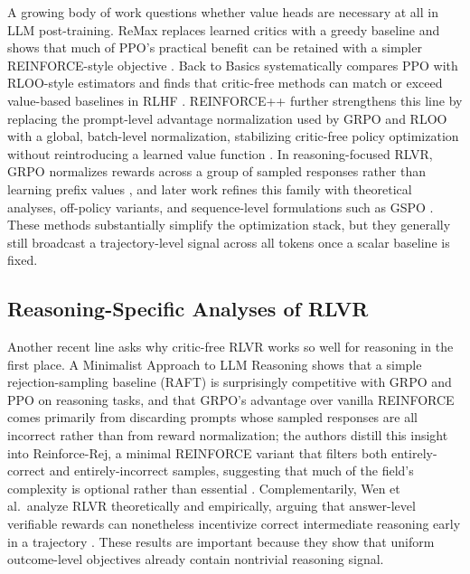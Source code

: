A growing body of work questions whether value heads are necessary at all in LLM
post-training. ReMax replaces learned critics with a greedy baseline and shows that much
of PPO's practical benefit can be retained with a simpler REINFORCE-style objective
\cite{li2023remax}. Back to Basics systematically compares PPO with RLOO-style
estimators and finds that critic-free methods can match or exceed value-based baselines
in RLHF \cite{ahmadian2024backtobasics}. REINFORCE++ further strengthens this line by
replacing the prompt-level advantage normalization used by GRPO and RLOO with a
global, batch-level normalization, stabilizing critic-free policy optimization
without reintroducing a learned value function \cite{hu2025reinforcepp}. In reasoning-focused RLVR, GRPO
normalizes rewards across a group of sampled responses rather than learning prefix
values \cite{shao2024deepseekmath}, and later work refines this family with theoretical
analyses, off-policy variants, and sequence-level formulations such as GSPO
\cite{mroueh2025revisiting,zheng2025gspo}. These methods substantially simplify the
optimization stack, but they generally still broadcast a trajectory-level signal across
all tokens once a scalar baseline is fixed.

\subsection{Reasoning-Specific Analyses of RLVR}

Another recent line asks why critic-free RLVR works so well for reasoning in the first
place. A Minimalist Approach to LLM Reasoning shows that a simple rejection-sampling
baseline (RAFT) is surprisingly competitive with GRPO and PPO on reasoning
tasks, and that GRPO's advantage over vanilla REINFORCE comes primarily from
discarding prompts whose sampled responses are all incorrect rather than from
reward normalization; the authors distill this insight into Reinforce-Rej, a
minimal REINFORCE variant that filters both entirely-correct and
entirely-incorrect samples, suggesting that much of the field's complexity is
optional rather than essential \cite{xiong2025minimalist}. Complementarily, Wen et al.\
analyze RLVR theoretically and empirically, arguing that answer-level verifiable rewards
can nonetheless incentivize correct intermediate reasoning early in a trajectory
\cite{wen2025rlvrimplicit}. These results are important because they show that uniform
outcome-level objectives already contain nontrivial reasoning signal.

